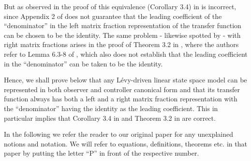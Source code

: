 \documentclass[preprint,a4paper,authoryear]{imsart}
\numberwithin{equation}{section}
\theoremstyle{plain}
\theoremstyle{definition}
\theoremstyle{remark}
\begin{document}
But as observed in \cite{FasenSchenk2024} the proof of this equivalence (Corollary 3.4) in \cite{schlemmmixing2010} is incorrect, since Appendix 2 of \cite{Caines1988} does not guarantee that the leading coefficient of the ``denominator'' in the left matrix fraction representation of the transfer function can be chosen to be the identity. The same problem - likewise spotted by \cite{FasenSchenk2024} -  with right matrix fractions arises in the proof of Theorem 3.2 in \cite{brockwell2011parametric}, where the authors refer to Lemma 6.3-8 of \cite{Kailath1980}, which also does not establish that the leading coefficient in the ``denominator'' can be taken to be the identity. 

Hence, we shall prove below that any L\'evy-driven linear state space model can be represented in both observer and controller canonical form and that its transfer function always has both a left and a right matrix fraction representation with the ``denominator'' having the identity as the leading coefficient. This in particular implies that Corollary 3.4 in \cite{schlemmmixing2010} and Theorem 3.2 in \cite{brockwell2011parametric} are correct.

In the following we refer the reader to our original paper \cite{schlemmmixing2010} for any unexplained notions and notation. We will refer to equations, definitions, theorems etc. in that paper by putting the letter ``P'' in front of the respective number.
\end{document}
